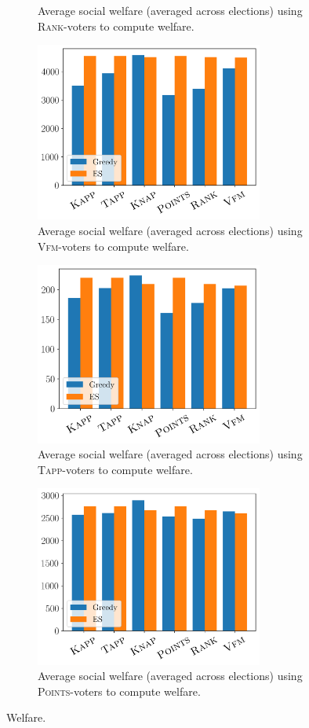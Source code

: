 \documentclass[letterpaper]{article} %
\newcommand{\points}{\textsc{Points}}
\newcommand{\rank}{\textsc{Rank}}
\newcommand{\vfm}{\textsc{Vfm}}
\newcommand{\tapp}{\textsc{Tapp}}
\begin{document}
\begin{figure}[ht]
\begin{subfigure}[b]{0.45\textwidth}
\caption{Average social welfare (averaged across elections) using \rank{}-voters to compute welfare.
}\label{fig:rank_welfare}
     \end{subfigure}
     \hfill
     \begin{subfigure}[b]{0.45\textwidth}
         \centering
\includegraphics[width=7.5cm]{experiment/Ranking_value_money_welfare.png}
\caption{Average social welfare (averaged across elections) using \vfm{}-voters to compute welfare.
}\label{fig:vfm_welfare}
     \end{subfigure}
     \begin{subfigure}[b]{0.45\textwidth}
         \centering
\includegraphics[width=7.5cm]{experiment/Threshold_welfare.png}
\caption{Average social welfare (averaged across elections) using \tapp{}-voters to compute welfare.
}\label{fig:tapp_welfare}
     \end{subfigure}
     \hfill
     \begin{subfigure}[b]{0.45\textwidth}
         \centering
\includegraphics[width=7.5cm]{experiment/Utilities_welfare.png}
\caption{Average social welfare (averaged across elections) using \points{}-voters to compute welfare.
}\label{fig:util_welfare}
     \end{subfigure}
     

        \caption{Welfare.}
        \label{fig:entropy:app}
\end{figure}
\end{document}
